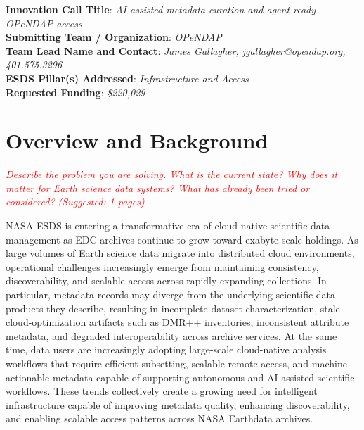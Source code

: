 \documentclass[11pt]{article}
\begin{document}
% 


\lstset{basicstyle=\footnotesize\ttfamily,breaklines=true}
\lstset{framextopmargin=5pt,frame=single}

\begin{flushleft}
\noindent \textbf{Innovation Call Title}: {\em AI-assisted metadata curation and agent-ready OPeNDAP access}\\
\textbf{Submitting Team / Organization}: {\em OPeNDAP}\\
\textbf{Team Lead Name and Contact}: {\em James Gallagher, jgallagher@opendap.org, 401.575.3296}\\
\textbf{ESDS Pillar(s) Addressed}: {\em Infrastructure and Access}\\
\textbf{Requested Funding}: {\em \$220,029}
\end{flushleft}


\section{Overview and Background}
\textcolor{red}{\textit{Describe the problem you are solving. What is the current state? Why does it matter for Earth science data systems? What has already been tried or considered? (Suggested: 1 pages)}}

\ac{NASA} \ac{ESDS} is entering a transformative era of cloud-native scientific data management as \ac{EDC} archives continue to grow toward exabyte-scale holdings. As large volumes of Earth science data migrate into distributed cloud environments, operational challenges increasingly emerge from maintaining consistency, discoverability, and scalable access across rapidly expanding collections. In particular, metadata records may diverge from the underlying scientific data products they describe, resulting in incomplete dataset characterization, stale cloud-optimization artifacts such as \ac{DMR++} inventories, inconsistent attribute metadata, and degraded interoperability across archive services. At the same time, data users are increasingly adopting large-scale cloud-native analysis workflows that require efficient subsetting, scalable remote access, and machine-actionable metadata capable of supporting autonomous and \ac{AI}-assisted scientific workflows. These trends collectively create a growing need for intelligent infrastructure capable of improving metadata quality, enhancing discoverability, and enabling scalable access patterns across \ac{NASA} Earthdata archives.
\end{document}
